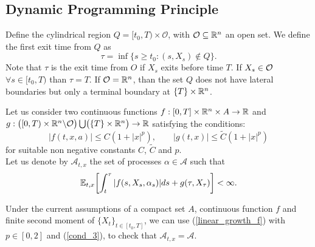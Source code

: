\subsection{Dynamic Programming Principle}

Define the cylindrical region $Q = [t_0,T) \times \mathcal{O}$, with $\mathcal{O} \subseteq \mathbb{R}^n$ an open set. 
We define the first exit time from $Q$ as 
\begin{equation}\label{exit_time_def}
 \tau = \inf \{ s \geq t_0: (s,X_s) \not\in Q \}. 
\end{equation}
Note that $\tau$ is the exit time from $O$ if $X_s$ exits before time $T$. If $X_s \in \mathcal{O}$ $\forall s \in [t_0,T)$ than $\tau = T$. If $\mathcal{O} = \mathbb{R}^n$, than the set $Q$ 
does not have lateral boundaries but only a terminal boundary at $\{ T \} \times \mathbb{R}^n$.

\noindent
Let us consider two continuous functions $f:[0,T]\times \mathbb{R}^n \times A \to \mathbb{R}$ and $g: \bigl( [0,T)\times \mathbb{R}^n \backslash \mathcal{O} \bigr) \bigcup \bigl( \{T\} \times \mathbb{R}^n \bigr) \to \mathbb{R}$ 
satisfying the conditions:
 \begin{equation}\label{linear_growth_f}
  |f(t,x,a)| \leq C (1+|x|^p), \quad \quad |g(t,x)| \leq \tilde C (1+|x|^p)
 \end{equation}
for suitable non negative constants $C$, $\tilde C$ and $p$.\\
Let us denote by $\mathcal{A}_{t,x}$ the set of processes $\alpha \in \mathcal{A}$ such that 
\begin{equation}
\mathbb{E}_{t,x} \biggl[ \int_{t}^{\tau} |f(s,X_s,\alpha_s)| ds + g(\tau, X_{\tau}) \biggr] < \infty. 
\end{equation}
\begin{Remark}
 Under the current assumptions of a compact set $A$, continuous function $f$ and finite second moment of $\{X_{t}\}_{t\in [t_0,T]}$, 
 we can use (\ref{linear_growth_f}) with $p\in [0,2]$ and (\ref{cond_3}), to check that $\mathcal{A}_{t,x} = \mathcal{A}$. 
\end{Remark}

